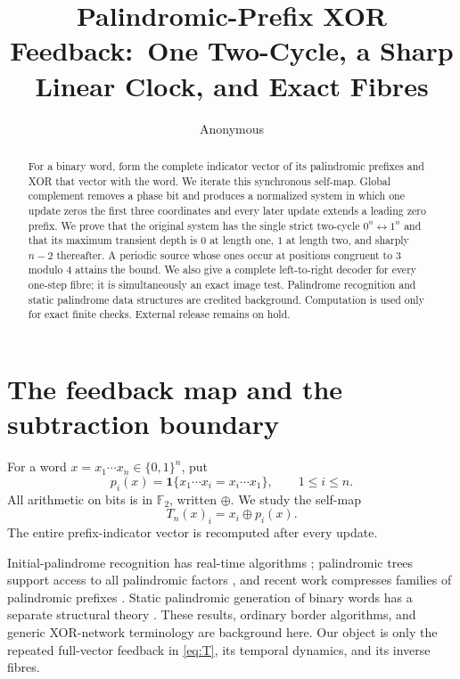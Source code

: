 \documentclass[10pt,a4paper]{amsart}
\title[Palindromic-prefix XOR feedback]{Palindromic-Prefix XOR Feedback:\
One Two-Cycle, a Sharp Linear Clock, and Exact Fibres}
\author{Anonymous}
\date{}
\theoremstyle{definition}
\theoremstyle{remark}
\newcommand{\Bn}{\{0,1\}^n}
\newcommand{\ind}{\mathbf 1}
\begin{document}
\begin{abstract}
For a binary word, form the complete indicator vector of its palindromic
prefixes and XOR that vector with the word.  We iterate this synchronous
self-map.  Global complement removes a phase bit and produces a normalized
system in which one update zeros the first three coordinates and every later
update extends a leading zero prefix.  We prove that the original system has
the single strict two-cycle $0^n\leftrightarrow1^n$ and that its maximum
transient depth is $0$ at length one, $1$ at length two, and sharply $n-2$
thereafter.  A periodic source whose ones occur at positions congruent to
$3$ modulo $4$ attains the bound.  We also give a complete left-to-right
decoder for every one-step fibre; it is simultaneously an exact image test.
Palindrome recognition and static palindrome data structures are credited
background.  Computation is used only for exact finite checks.  External
release remains on hold.
\end{abstract}

\maketitle

\section{The feedback map and the subtraction boundary}

For a word $x=x_1\cdots x_n\in\Bn$, put
\[
 p_i(x)=\ind\{x_1\cdots x_i=x_i\cdots x_1\},\qquad 1\le i\le n.
\]
All arithmetic on bits is in $\mathbb F_2$, written $\oplus$.  We study the
self-map
\begin{equation}\label{eq:T}
 T_n(x)_i=x_i\oplus p_i(x).
\end{equation}
The entire prefix-indicator vector is recomputed after every update.

Initial-palindrome recognition has real-time algorithms
\cite{Galil1978}; palindromic trees support access to all palindromic factors
\cite{RubinchikShur2018}, and recent work compresses families of
palindromic prefixes \cite{BathieEllertStarikovskaya2025}.  Static
palindromic generation of binary words has a separate structural theory
\cite{HarjuHuovaZamboni2015}.  These results, ordinary border algorithms, and
generic XOR-network terminology are background here.  Our object is only the
repeated full-vector feedback in \eqref{eq:T}, its temporal dynamics, and its
inverse fibres.
\end{document}
